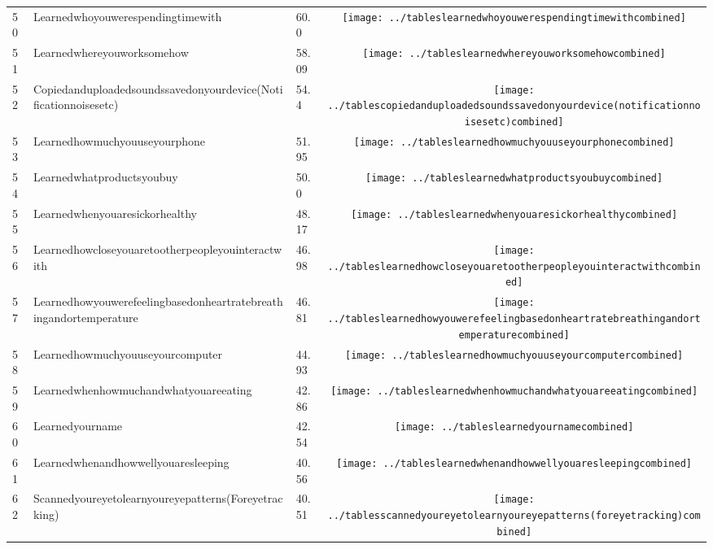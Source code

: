 \documentclass[a4paper,12pt]{article}
\begin{document}
\begin{longtable}{| p{0.5cm} | p{7cm} | p{1cm} | c |}
50 & Learnedwhoyouwerespendingtimewith & 60.0 & \texttt{[image: ../tableslearnedwhoyouwerespendingtimewithcombined]} \\ 
51 & Learnedwhereyouworksomehow & 58.09 & \texttt{[image: ../tableslearnedwhereyouworksomehowcombined]} \\ 
52 & Copiedanduploadedsoundssavedonyourdevice(Notificationnoisesetc) & 54.4 & \texttt{[image: ../tablescopiedanduploadedsoundssavedonyourdevice(notificationnoisesetc)combined]} \\ 
53 & Learnedhowmuchyouuseyourphone & 51.95 & \texttt{[image: ../tableslearnedhowmuchyouuseyourphonecombined]} \\ 
54 & Learnedwhatproductsyoubuy & 50.0 & \texttt{[image: ../tableslearnedwhatproductsyoubuycombined]} \\ 
55 & Learnedwhenyouaresickorhealthy & 48.17 & \texttt{[image: ../tableslearnedwhenyouaresickorhealthycombined]} \\ 
56 & Learnedhowcloseyouaretootherpeopleyouinteractwith & 46.98 & \texttt{[image: ../tableslearnedhowcloseyouaretootherpeopleyouinteractwithcombined]} \\ 
57 & Learnedhowyouwerefeelingbasedonheartratebreathingandortemperature & 46.81 & \texttt{[image: ../tableslearnedhowyouwerefeelingbasedonheartratebreathingandortemperaturecombined]} \\ 
58 & Learnedhowmuchyouuseyourcomputer & 44.93 & \texttt{[image: ../tableslearnedhowmuchyouuseyourcomputercombined]} \\ 
59 & Learnedwhenhowmuchandwhatyouareeating & 42.86 & \texttt{[image: ../tableslearnedwhenhowmuchandwhatyouareeatingcombined]} \\ 
60 & Learnedyourname & 42.54 & \texttt{[image: ../tableslearnedyournamecombined]} \\ 
61 & Learnedwhenandhowwellyouaresleeping & 40.56 & \texttt{[image: ../tableslearnedwhenandhowwellyouaresleepingcombined]} \\ 
62 & Scannedyoureyetolearnyoureyepatterns(Foreyetracking) & 40.51 & \texttt{[image: ../tablesscannedyoureyetolearnyoureyepatterns(foreyetracking)combined]} \\ 

\end{longtable}
\end{document}
